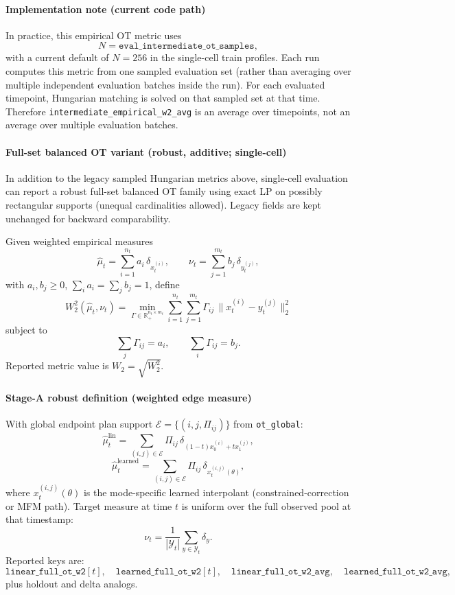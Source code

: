 \documentclass[11pt]{article}
\begin{document}
\paragraph{Implementation note (current code path)}
In practice, this empirical OT metric uses
\[
N=\texttt{eval\_intermediate\_ot\_samples},
\]
with a current default of $N=256$ in the single-cell train profiles.
Each run computes this metric from one sampled evaluation set (rather than averaging over multiple independent evaluation batches inside the run).
For each evaluated timepoint, Hungarian matching is solved on that sampled set at that time.
Therefore \texttt{intermediate\_empirical\_w2\_avg} is an average over timepoints, not an average over multiple evaluation batches.

\paragraph{Full-set balanced OT variant (robust, additive; single-cell)}
In addition to the legacy sampled Hungarian metrics above, single-cell evaluation can report a robust full-set balanced OT family using exact LP on possibly rectangular supports (unequal cardinalities allowed).
Legacy fields are kept unchanged for backward comparability.

Given weighted empirical measures
\[
\hat{\mu}_t=\sum_{i=1}^{n_t} a_i\,\delta_{x_t^{(i)}},\qquad
\nu_t=\sum_{j=1}^{m_t} b_j\,\delta_{y_t^{(j)}},
\]
with $a_i,b_j\ge 0$, $\sum_i a_i=\sum_j b_j=1$, define
\[
W_2^2(\hat{\mu}_t,\nu_t)
=
\min_{\Gamma\in\mathbb{R}_+^{n_t\times m_t}}
\sum_{i=1}^{n_t}\sum_{j=1}^{m_t}
\Gamma_{ij}\,\|x_t^{(i)}-y_t^{(j)}\|_2^2
\]
subject to
\[
\sum_j \Gamma_{ij}=a_i,\qquad
\sum_i \Gamma_{ij}=b_j.
\]
Reported metric value is $W_2=\sqrt{W_2^2}$.

\paragraph{Stage-A robust definition (weighted edge measure)}
With global endpoint plan support $\mathcal{E}=\{(i,j,\Pi_{ij})\}$ from \texttt{ot\_global}:
\[
\hat{\mu}^{\mathrm{lin}}_t
=
\sum_{(i,j)\in\mathcal{E}}
\Pi_{ij}\,
\delta_{(1-t)x_0^{(i)}+tx_1^{(j)}},
\]
\[
\hat{\mu}^{\mathrm{learned}}_t
=
\sum_{(i,j)\in\mathcal{E}}
\Pi_{ij}\,
\delta_{x_t^{(i,j)}(\theta)},
\]
where $x_t^{(i,j)}(\theta)$ is the mode-specific learned interpolant (constrained-correction or MFM path).
Target measure at time $t$ is uniform over the full observed pool at that timestamp:
\[
\nu_t=\frac{1}{|\mathcal{Y}_t|}\sum_{y\in\mathcal{Y}_t}\delta_y.
\]
Reported keys are:
\[
\texttt{linear\_full\_ot\_w2}[t],\quad
\texttt{learned\_full\_ot\_w2}[t],\quad
\texttt{linear\_full\_ot\_w2\_avg},\quad
\texttt{learned\_full\_ot\_w2\_avg},
\]
plus holdout and delta analogs.
\end{document}
